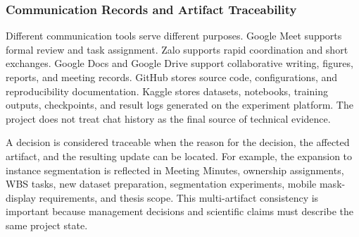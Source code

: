 \documentclass[12pt,a4paper]{report}
\begin{document}
\subsubsection{Communication Records and Artifact Traceability}
Different communication tools serve different purposes. Google Meet supports formal review and task assignment. Zalo supports rapid coordination and short exchanges. Google Docs and Google Drive support collaborative writing, figures, reports, and meeting records. GitHub stores source code, configurations, and reproducibility documentation. Kaggle stores datasets, notebooks, training outputs, checkpoints, and result logs generated on the experiment platform. The project does not treat chat history as the final source of technical evidence.\par
A decision is considered traceable when the reason for the decision, the affected artifact, and the resulting update can be located. For example, the expansion to instance segmentation is reflected in Meeting Minutes, ownership assignments, WBS tasks, new dataset preparation, segmentation experiments, mobile mask-display requirements, and thesis scope. This multi-artifact consistency is important because management decisions and scientific claims must describe the same project state.\par
\end{document}

